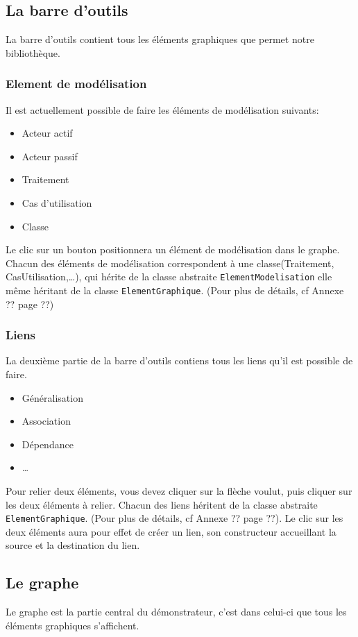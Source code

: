 \documentclass[12pt,a4paper,openany]{report}
\begin{document}
	\subsection{La barre d'outils}
	La barre d'outils contient tous les éléments graphiques que permet notre bibliothèque.
	\subsubsection{Element de modélisation}
	Il est actuellement possible de faire les éléments de modélisation suivants:
	\begin{itemize}
		\item Acteur actif
		\item Acteur passif
		\item Traitement
		\item Cas d'utilisation
		\item Classe
	\end{itemize}
	Le clic sur un bouton positionnera un élément de modélisation dans le graphe.\\
	Chacun des éléments de modélisation correspondent à une classe(Traitement, CasUtilisation,\ldots), qui hérite de la classe abstraite \texttt{ElementModelisation} 
	elle même héritant de la classe \texttt{ElementGraphique}. (Pour plus de détails, cf Annexe ?? page ??)%

	\subsubsection{Liens}
	La deuxième partie de la barre d'outils contiens tous les liens qu'il est possible de faire.
	\begin{itemize}
		\item Généralisation
		\item Association
		\item Dépendance
		\item \ldots
	\end{itemize}
	Pour relier deux éléments, vous devez cliquer sur la flèche voulut, puis cliquer sur les deux éléments à relier. 
	Chacun des liens héritent de la classe abstraite \texttt{ElementGraphique}. (Pour plus de détails, cf Annexe ?? page ??).%
	Le clic sur les deux éléments aura pour effet de créer un lien, son constructeur accueillant la source et la destination du lien.
	
	\subsection{Le graphe}
	Le graphe est la partie central du démonstrateur, c'est dans celui-ci que tous les éléments graphiques s'affichent.
\end{document}
